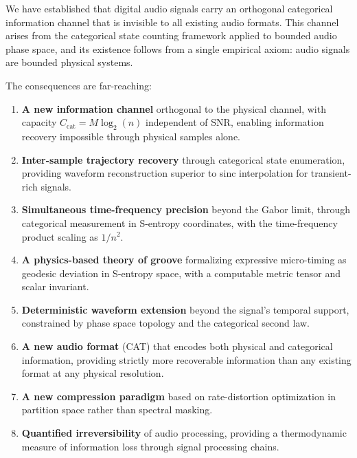 \documentclass[twocolumn,10pt]{article}
\theoremstyle{remark}
\newcommand{\Ccat}{C_{\mathrm{cat}}}
\begin{document}
We have established that digital audio signals carry an orthogonal categorical information channel that is invisible to all existing audio formats. This channel arises from the categorical state counting framework applied to bounded audio phase space, and its existence follows from a single empirical axiom: audio signals are bounded physical systems.

The consequences are far-reaching:

\begin{enumerate}
    \item \textbf{A new information channel} orthogonal to the physical channel, with capacity $\Ccat = M\log_2(n)$ independent of SNR, enabling information recovery impossible through physical samples alone.

    \item \textbf{Inter-sample trajectory recovery} through categorical state enumeration, providing waveform reconstruction superior to sinc interpolation for transient-rich signals.

    \item \textbf{Simultaneous time-frequency precision} beyond the Gabor limit, through categorical measurement in S-entropy coordinates, with the time-frequency product scaling as $1/n^2$.

    \item \textbf{A physics-based theory of groove} formalizing expressive micro-timing as geodesic deviation in S-entropy space, with a computable metric tensor and scalar invariant.

    \item \textbf{Deterministic waveform extension} beyond the signal's temporal support, constrained by phase space topology and the categorical second law.

    \item \textbf{A new audio format} (CAT) that encodes both physical and categorical information, providing strictly more recoverable information than any existing format at any physical resolution.

    \item \textbf{A new compression paradigm} based on rate-distortion optimization in partition space rather than spectral masking.

    \item \textbf{Quantified irreversibility} of audio processing, providing a thermodynamic measure of information loss through signal processing chains.
\end{enumerate}
\end{document}
